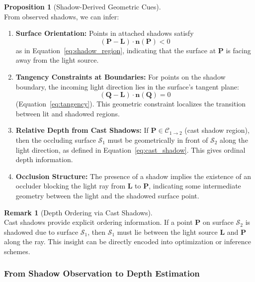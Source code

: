 \documentclass[12pt]{article}
\newcommand{\vect}[1]{\bm{#1}}
\theoremstyle{definition}
\newtheorem{proposition}{Proposition}[subsection]
\newtheorem{remark}{Remark}[subsection]
\begin{document}
\begin{proposition}[Shadow-Derived Geometric Cues] ~\\
From observed shadows, we can infer:
\begin{enumerate}[label=(\roman*)]
    \item \textbf{Surface Orientation:} Points in attached shadows satisfy
    \[
    (\vect{P} - \vect{L}) \cdot \vect{n}(\vect{P}) < 0
    \]
    as in Equation~\eqref{eq:shadow_region}, indicating that the surface at $\vect{P}$ is facing away from the light source.

    \item \textbf{Tangency Constraints at Boundaries:} For points on the shadow boundary, the incoming light direction lies in the surface's tangent plane:
    \[
    (\vect{Q} - \vect{L}) \cdot \vect{n}(\vect{Q}) = 0
    \]
    (Equation~\eqref{eq:tangency}). This geometric constraint localizes the transition between lit and shadowed regions.

    \item \textbf{Relative Depth from Cast Shadows:} If $\vect{P} \in \mathcal{C}_{1 \to 2}$ (cast shadow region), then the occluding surface $\mathcal{S}_1$ must be geometrically in front of $\mathcal{S}_2$ along the light direction, as defined in Equation~\eqref{eq:cast_shadow}. This gives ordinal depth information.

    \item \textbf{Occlusion Structure:} The presence of a shadow implies the existence of an occluder blocking the light ray from $\vect{L}$ to $\vect{P}$, indicating some intermediate geometry between the light and the shadowed surface point.
\end{enumerate}
\end{proposition}

\begin{remark}[Depth Ordering via Cast Shadows] ~\\
Cast shadows provide explicit ordering information. If a point $\vect{P}$ on surface $\mathcal{S}_2$ is shadowed due to surface $\mathcal{S}_1$, then $\mathcal{S}_1$ must lie between the light source $\vect{L}$ and $\vect{P}$ along the ray. This insight can be directly encoded into optimization or inference schemes.
\end{remark}

\subsubsection*{From Shadow Observation to Depth Estimation}
\end{document}
